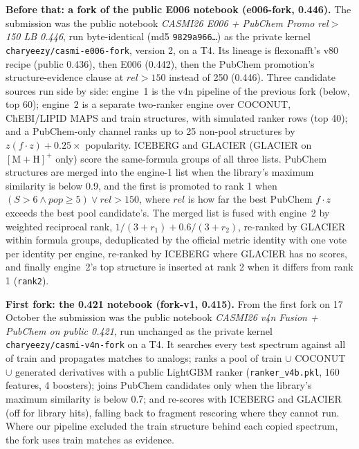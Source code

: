 \documentclass[11pt]{article}
\begin{document}
\textbf{Before that: a fork of the public E006 notebook (e006-fork, 0.446).} The submission was the public notebook
\emph{CASMI26 \textbar{} E006 + PubChem Promo rel$>$150 \textbar{} LB 0.446}, run byte-identical (md5
\texttt{9829a966\ldots}) as the private kernel \texttt{charyeezy/casmi-e006-fork}, version 2, on a T4. Its
lineage is flexonafft's v80 recipe (public 0.436), then E006 (0.442), then the PubChem promotion's
structure-evidence clause at $\mathit{rel} > 150$ instead of 250 (0.446). Three candidate sources run
side by side: engine~1 is the v4n pipeline of the previous fork (below, top 60); engine~2 is a separate
two-ranker engine over COCONUT, ChEBI/LIPID MAPS and train structures, with simulated ranker rows (top 40);
and a PubChem-only channel ranks up to 25 non-pool structures by $z(f\cdot z) + 0.25\times$ popularity.
ICEBERG and GLACIER (GLACIER on $[\mathrm{M{+}H}]^+$ only) score the same-formula groups of all three lists.
PubChem structures are merged into the engine-1 list when the library's maximum similarity is below 0.9,
and the first is promoted to rank 1 when $(S > 6 \wedge \mathit{pop} \geq 5) \vee \mathit{rel} > 150$,
where $\mathit{rel}$ is how far the best PubChem $f\cdot z$ exceeds the best pool candidate's. The merged
list is fused with engine~2 by weighted reciprocal rank, $1/(3+r_1) + 0.6/(3+r_2)$, re-ranked by GLACIER
within formula groups, deduplicated by the official metric identity with one vote per identity per
engine, re-ranked by ICEBERG where GLACIER has no scores, and finally engine~2's top structure is
inserted at rank 2 when it differs from rank 1 (\texttt{rank2}).

\textbf{First fork: the 0.421 notebook (fork-v1, 0.415).} From the first fork on 17 October
the submission was the public
notebook \emph{CASMI26 \textbar{} v4n Fusion + PubChem on public 0.421}, run unchanged as the private kernel
\texttt{charyeezy/casmi-v4n-fork} on a T4. It searches every test spectrum against all of train and
propagates matches to analogs; ranks a pool of train $\cup$ COCONUT $\cup$ generated derivatives with a
public LightGBM ranker (\texttt{ranker\_v4b.pkl}, 160 features, 4 boosters); joins PubChem candidates
only when the library's maximum similarity is below 0.7; and re-scores with ICEBERG and GLACIER (off for
library hits), falling back to fragment rescoring where they cannot run. Where our pipeline excluded the
train structure behind each copied spectrum, the fork uses train matches as evidence.
\end{document}
